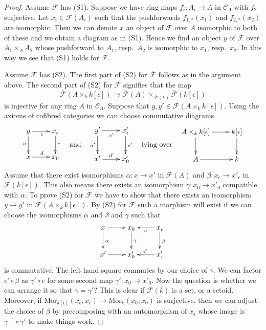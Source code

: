 \begin{proof}
Assume $\mathcal{F}$ has (S1).
Suppose we have ring maps $f_i : A_i \to A$ in $\mathcal{C}_\Lambda$
with $f_2$ surjective. Let $x_i \in \mathcal{F}(A_i)$ such that
the pushforwards $f_{1, *}(x_1)$ and $f_{2, *}(x_2)$ are isomorphic.
Then we can denote $x$ an object of $\mathcal{F}$ over $A$ isomorphic
to both of these and we obtain a diagram as in (S1). Hence we find
an object $y$ of $\mathcal{F}$ over $A_1 \times_A A_2$ whose pushforward
to $A_1$, resp.\ $A_2$ is isomorphic to $x_1$, resp.\ $x_2$. In this way
we see that (S1) holds for $\overline{\mathcal{F}}$.

\medskip\noindent
Assume $\mathcal{F}$ has (S2).
The first part of (S2) for $\overline{\mathcal{F}}$ follows as in
the argument above. The second part of (S2) for
$\overline{\mathcal{F}}$ signifies that the map
$$
\overline{\mathcal{F}}(A \times_{k} k[\epsilon]) \to
\overline{\mathcal{F}}(A)
\times_{\overline{\mathcal{F}}(k)} \overline{\mathcal{F}}(k[\epsilon])
$$
is injective for any ring $A$ in $\mathcal{C}_\Lambda$. Suppose that
$y, y' \in \mathcal{F}(A \times_k k[\epsilon])$. Using the axioms
of cofibred categories we can choose commutative diagrams
$$
\vcenter{
\xymatrix{
y \ar[r]_c \ar[d]_a & x_\epsilon \ar[d]^e \\
x \ar[r]^d          & x_0
}
}
\quad\text{and}\quad
\vcenter{
\xymatrix{
y' \ar[r]_{c'} \ar[d]_{a'} & x'_\epsilon \ar[d]^{e'} \\
x' \ar[r]^{d'}                 & x'_0
}
}
\quad\text{lying over}\quad
\vcenter{
\xymatrix{
A \times_k k[\epsilon] \ar[d] \ar[r] & k[\epsilon] \ar[d] \\
A \ar[r] & k
}
}
$$
Assume that there exist isomorphisms
$\alpha : x \to x'$ in $\mathcal{F}(A)$ and
$\beta : x_\epsilon \to x'_\epsilon$ in $\mathcal{F}(k[\epsilon])$.
This also means there exists an isomorphism $\gamma : x_0 \to x'_0$
compatible with $\alpha$. To prove (S2) for $\overline{\mathcal{F}}$
we have to show that there exists an isomorphism $y \to y'$ in
$\mathcal{F}(A \times_k k[\epsilon])$.
By (S2) for $\mathcal{F}$ such a morphism will exist if we can
choose the isomorphisms $\alpha$ and $\beta$ and $\gamma$ such that
$$
\xymatrix{
x \ar[d]^\alpha \ar[r] & x_0 \ar[d]^\gamma &
x_\epsilon \ar[d]^\beta \ar[l]^e \\
x' \ar[r] & x'_0 & x'_\epsilon \ar[l]_{e'}
}
$$
is commutative. The left hand square commutes by our choice of $\gamma$.
We can factor $e' \circ \beta$ as $\gamma' \circ e$ for some second map
$\gamma' : x_0 \to x'_0$. Now the question is whether we can arrange it so
that $\gamma = \gamma'$? This is clear if $\mathcal{F}(k)$ is a set, or a
setoid. Moreover, if
$\text{Mor}_{k[\epsilon]}(x_\epsilon, x_\epsilon) \to \text{Mor}_k(x_0, x_0)$
is surjective, then we can adjust the choice of $\beta$ by precomposing
with an automorphism of $x_\epsilon$ whose image is
$\gamma^{-1} \circ \gamma'$ to make things work.
\end{proof}

